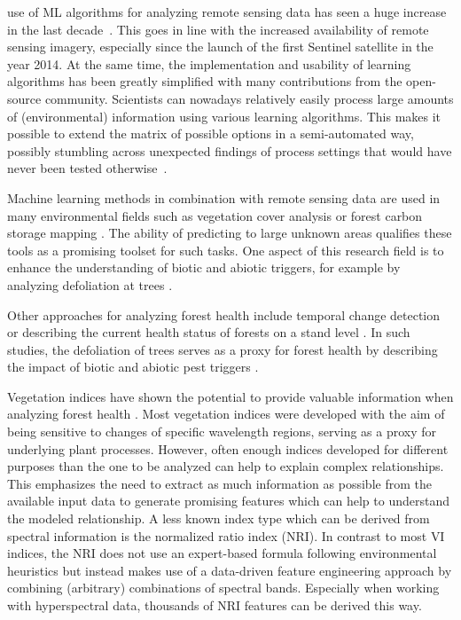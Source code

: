 \documentclass[letterpaper, peerreview, draftcls]{IEEEtran}
\begin{document}
 use of \ac{ML} algorithms for analyzing remote sensing data has seen a huge increase in the last decade~\cite{lary2016}.
This goes in line with the increased availability of remote sensing imagery, especially since the launch of the first Sentinel satellite in the year 2014.
At the same time, the implementation and usability of learning algorithms has been greatly simplified with many contributions from the open-source community.
Scientists can nowadays relatively easily process large amounts of (environmental) information using various learning algorithms.
This makes it possible to extend the matrix of possible options in a semi-automated way, possibly stumbling across unexpected findings of process settings that would have never been tested otherwise~\cite{ma2015}.


Machine learning methods in combination with remote sensing data are used in many environmental fields such as vegetation cover analysis or forest carbon storage mapping \cite{mascaro2014, urban2018}.
The ability of predicting to large unknown areas qualifies these tools as a promising toolset for such tasks.
One aspect of this research field is to enhance the understanding of biotic and abiotic triggers, for example by analyzing defoliation at trees \cite{hawrylo2018}.

Other approaches for analyzing forest health include temporal change detection \cite{zhang2016} or describing the current health status of forests on a stand level \cite{townsend2012}.
In such studies, the defoliation of trees serves as a proxy for forest health by describing the impact of biotic and abiotic pest triggers \cite{townsend2012, goodbody2018}.

Vegetation indices have shown the potential to provide valuable information when analyzing forest health \cite{jiang2014, adamczyk2015}.
Most vegetation indices were developed with the aim of being sensitive to changes of specific wavelength regions, serving as a proxy for underlying plant processes. 
However, often enough indices developed for different purposes than the one to be analyzed can help to explain complex relationships.
This emphasizes the need to extract as much information as possible from the available input data to generate promising features which can help to understand the modeled relationship.
A less known index type which can be derived from spectral information is the normalized ratio index (NRI).
In contrast to most \ac{VI} indices, the \ac{NRI} does not use an expert-based formula following environmental heuristics but instead makes use of a data-driven feature engineering approach by combining (arbitrary) combinations of spectral bands.
Especially when working with hyperspectral data, thousands of \ac{NRI} features can be derived this way.
\end{document}
